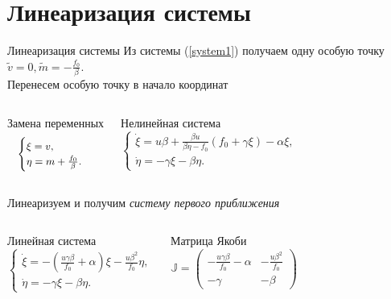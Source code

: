 \documentclass{beamer}
\begin{document}
\section{Линеаризация системы}
	\begin{frame}{Линеаризация системы}
	Из системы (\ref{system1}) получаем одну особую точку $\tilde v=0,\tilde m=-\frac{f_0}{\beta}$.\\
		Перенесем особую точку в начало координат
			\begin{columns}
			\begin{block}{Замена переменных}
				\[
				\small
				\begin{cases}
					\xi=v,\\
					\eta=m+\frac{f_0}{\beta}.
				\end{cases}
				\]
			\end{block}
			\begin{block}{Нелинейная система}
					\small
					\begin{equation}
							\begin{cases}
							\dot \xi=u\beta+\frac{\beta u}{\beta\eta-f_0}(f_0+\gamma\xi)-\alpha\xi,\\
							\dot \eta=-\gamma \xi -\beta \eta.
						\end{cases}
					\end{equation}
			\end{block}
		\end{columns}
	\medskip
		Линеаризуем и получим \textit{систему первого приближения}
		\begin{columns}
		\column{0.5\textwidth}
	\begin{block}{Линейная система}
			\small
			\begin{equation}
\begin{cases}
	\dot \xi=-(\frac{u\gamma \beta}{f_0}+\alpha)\xi-\frac{u\beta^2}{f_0}\eta,\\
	\dot \eta=-\gamma \xi -\beta \eta.
\end{cases}
			\end{equation}
	\end{block}
		\column{0.5\textwidth}
		\begin{block}{Матрица Якоби}
				\small
				\begin{equation}
	\mathbb{J}=\begin{pmatrix}
	-\frac{u\gamma \beta}{f_0}-\alpha & -\frac{u\beta^2}{f_0} \\
	-\gamma & -\beta
\end{pmatrix}
				\end{equation}
		\end{block}
	\end{columns}
	\end{frame}	
	
\end{document}
